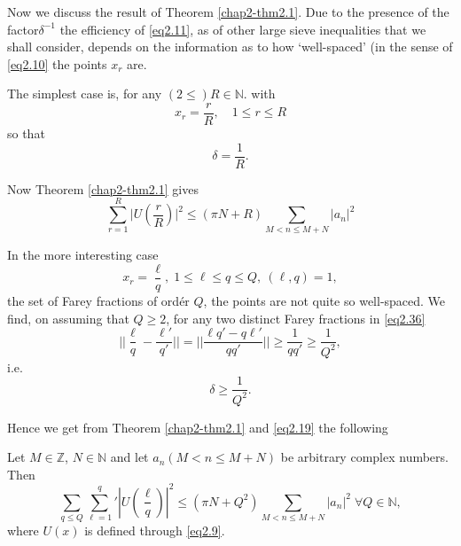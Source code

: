 Now we discuss the result of Theorem \ref{chap2-thm2.1}. Due to the
presence of the 
factor\pageoriginale $\delta^{-1}$ the efficiency of \eqref{eq2.11},
as of other large 
sieve inequalities that we shall consider, depends on the information
as to how `well-spaced' (in the sense of \eqref{eq2.10} the points $x_r$
are. 

The simplest case is, for any $(2 \le) R \in \mathbb{N}$. with 
\begin{equation*}
x_r = \frac{r}{R},\quad 1\leq r \leq R \tag{2.33}\label{eq2.33}
\end{equation*} 
so that 
\begin{equation*}
\delta= \frac{1}{R}. \tag{2.34}\label{eq2.34}
\end{equation*}

Now Theorem \ref{chap2-thm2.1} gives 
\begin{equation*}
\sum_{r=1}^R \bigg| U(\frac{r}{R}) \bigg|^2 \le (\pi N+R ) \sum_{M< n
  \le M+N}|a_n|^2 \tag{2.35}\label{eq2.35}  
\end{equation*}

In the more interesting case 
\begin{equation*}
x_r = \frac{\ell}{q}, \; 1 \le \ell \le q \le Q, ~ (\ell ,q)=1,
\tag{2.36}\label{eq2.36} 
\end{equation*}
the set of Farey fractions of ord\'er $Q$, the points  are not quite so
well-spaced. We find, on assuming that $Q \geq 2$, for any two
distinct Farey fractions in \eqref{eq2.36} 
\begin{equation*}
|| \frac{\ell}{q}- \frac{\ell'}{q'}||= \bigg| \bigg| \frac{\ell q' - q
  \ell'}{qq'}\bigg| \bigg| \geq \frac{1}{qq'} \ge \frac{1}{Q^2},
\tag{2.37}\label{eq2.37} 
\end{equation*}
i.e.
\begin{equation*}
\delta \ge \frac{1}{Q^2}. \tag{2.38}\label{eq2.38}
\end{equation*}

Hence we get from Theorem \ref{chap2-thm2.1} and \eqref{eq2.19} the following 

\begin{theorem}\label{chap2-thm2.2} %
Let $M \in \mathbb{Z}$, $N \in \mathbb{N}$ and let $a_n(M < n \le M+N)$
be arbitrary complex numbers. Then  
\begin{equation*}
\sum_{q \leq Q} \sum_{\ell = 1}^{q}{'}| U(\frac{\ell}{q}) |^2 \leq
(\pi N+Q^2) \sum_{M< n \leq M+N}|a_n|^2 \; \forall Q \in \mathbb{N},
\tag{2.39}\label{eq2.39} 
\end{equation*}
where $U(x)$ is defined through \eqref{eq2.9}.
\end{theorem}


